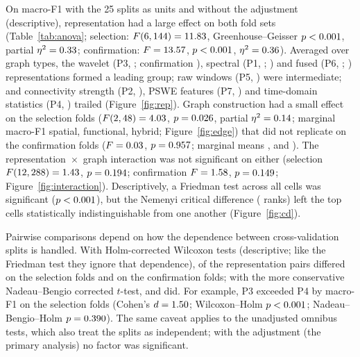 On macro-F1 with the 25 splits as units and without the adjustment (descriptive), representation had a
large effect on both fold sets (Table~\ref{tab:anova}; selection:
$F(6,144)=11.83$, Greenhouse--Geisser $p<0.001$, partial
$\eta^2=0.33$; confirmation: $F=13.57$, $p<0.001$, $\eta^2=0.36$).
Averaged over graph types, the wavelet (P3, \repPThree{}; confirmation \crepPThree{}), spectral
(P1, \repPOne{}; \crepPOne{}) and fused (P6, \repPSix{}; \crepPSix{}) representations formed a leading
group; raw windows (P5, \repPFive{}) were intermediate; and connectivity strength (P2, \repPTwo{}),
PSWE features (P7, \repPSeven{}) and time-domain statistics (P4, \repPFour{}) trailed
(Figure~\ref{fig:rep}). Graph construction had a small effect on the selection folds
($F(2,48)=4.03$, $p=0.026$, partial $\eta^2=0.14$;
marginal macro-F1 \edgespatial{} spatial, \edgefunctional{} functional, \edgehybrid{} hybrid;
Figure~\ref{fig:edge}) that did not replicate on the confirmation folds ($F=0.03$,
$p=0.957$; marginal means \cedgespatial{}, \cedgefunctional{} and \cedgehybrid{}). The
representation~$\times$~graph interaction was not significant on either
(selection $F(12,288)=1.43$, $p=0.194$; confirmation
$F=1.58$, $p=0.149$; Figure~\ref{fig:interaction}). Descriptively, a Friedman test across all cells
was significant ($p<0.001$), but the Nemenyi critical difference (\cdValue{} ranks) left the top
cells statistically indistinguishable from one another (Figure~\ref{fig:cd}).

Pairwise comparisons depend on how the dependence between cross-validation splits is handled. With
Holm-corrected Wilcoxon tests (descriptive; like the Friedman test they ignore that dependence), \nPairsWilcoxonSig{} of the \nPairs{} representation pairs differed on
the selection folds and \cPairsWilcoxonSig{} on the confirmation folds; with the more conservative
Nadeau--Bengio corrected $t$-test, \nPairsNbSig{} and \cPairsNbSig{} did. For example, P3 exceeded P4
by \pThreeFourDiff{} macro-F1 on the selection folds (Cohen's $d=1.50$; Wilcoxon--Holm
$p<0.001$; Nadeau--Bengio--Holm $p=0.390$). The same caveat applies to the
unadjusted omnibus tests, which also treat the splits as independent; with the adjustment (the primary
analysis) no factor was significant.

